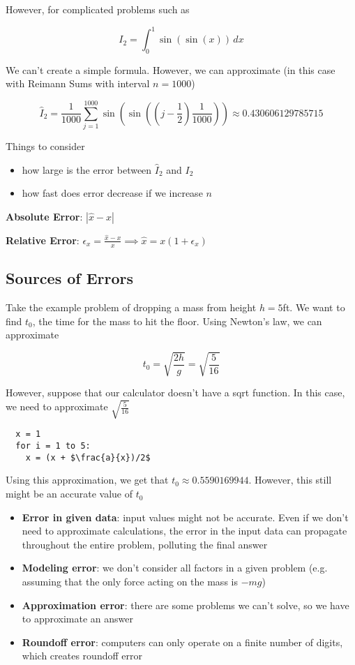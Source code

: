 \documentclass{article}
\begin{document}
  However, for complicated problems such as

  \[I_2 = \int_0^1 \sin(\sin(x)) \, dx\]

  We can't create a simple formula. However, we can approximate (in this case with Reimann Sums with interval $n = 1000$)

  \[\hat{I}_2 = \frac{1}{1000} \sum_{j = 1}^{1000} \sin(\sin((j - \frac{1}{2}) \frac{1}{1000})) \approx 0.430606129785715\]

  Things to consider
  \begin{itemize}
    \item how large is the error between $\hat{I}_2$ and $I_2$
    \item how fast does error decrease if we increase $n$
  \end{itemize}

  \textbf{Absolute Error}: $|\hat{x} - x|$

  \textbf{Relative Error}: $\epsilon_x = \frac{\hat{x} - x}{x} \implies \hat{x} = x(1 + \epsilon_x)$

  \subsection{Sources of Errors}
  Take the example problem of dropping a mass from height $h = 5$ft. We want to find $t_0$, the time for the mass to hit the floor. Using Newton's law, we can approximate

  \[t_0 = \sqrt{\frac{2h}{g}} = \sqrt{\frac{5}{16}}\]

  However, suppose that our calculator doesn't have a sqrt function. In this case, we need to approximate $\sqrt{\frac{5}{16}}$

  \begin{lstlisting}
  x = 1
  for i = 1 to 5:
    x = (x + $\frac{a}{x})/2$
  \end{lstlisting}
  Using this approximation, we get that $t_0 \approx 0.5590169944$. However, this still might be an accurate value of $t_0$

  \begin{itemize}
    \item \textbf{Error in given data}: input values might not be accurate. Even if we don't need to approximate calculations, the error in the input data can propagate throughout the entire problem, polluting the final answer
    \item \textbf{Modeling error}: we don't consider all factors in a given problem (e.g. assuming that the only force acting on the mass is $-mg$)
    \item \textbf{Approximation error}: there are some problems we can't solve, so we have to approximate an answer
    \item \textbf{Roundoff error}: computers can only operate on a finite number of digits, which creates roundoff error
  \end{itemize}
\end{document}
